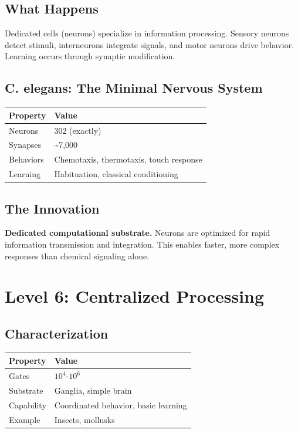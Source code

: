 \documentclass[
  11pt,
  letterpaper,
  twoside,
  openright]{book}
\begin{document}
\subsection{What Happens}\label{what-happens-5}

Dedicated cells (neurons) specialize in information processing. Sensory
neurons detect stimuli, interneurons integrate signals, and motor
neurons drive behavior. Learning occurs through synaptic modification.

\subsection{C. elegans: The Minimal Nervous
System}\label{c.-elegans-the-minimal-nervous-system}

\begin{longtable}[]{@{}ll@{}}
\toprule\noalign{}
Property & Value \\
\midrule\noalign{}
\endhead
\bottomrule\noalign{}
\endlastfoot
Neurons & 302 (exactly) \\
Synapses & \textasciitilde7,000 \\
Behaviors & Chemotaxis, thermotaxis, touch response \\
Learning & Habituation, classical conditioning \\
\end{longtable}

\subsection{The Innovation}\label{the-innovation-3}

\textbf{Dedicated computational substrate.} Neurons are optimized for
rapid information transmission and integration. This enables faster,
more complex responses than chemical signaling alone.

\section{Level 6: Centralized
Processing}\label{level-6-centralized-processing}

\subsection{Characterization}\label{characterization-6}

\begin{longtable}[]{@{}ll@{}}
\toprule\noalign{}
Property & Value \\
\midrule\noalign{}
\endhead
\bottomrule\noalign{}
\endlastfoot
Gates & \(10^4\)-\(10^6\) \\
Substrate & Ganglia, simple brain \\
Capability & Coordinated behavior, basic learning \\
Example & Insects, mollusks \\
\end{longtable}
\end{document}
